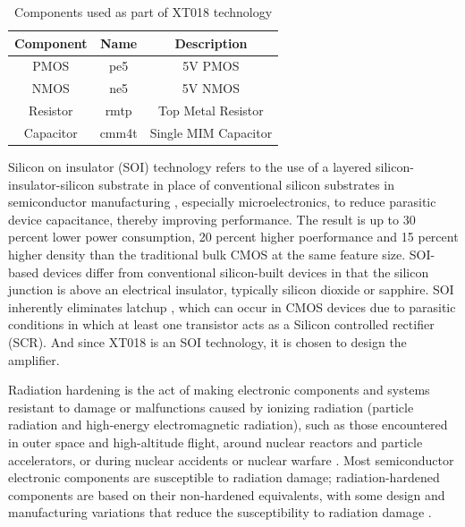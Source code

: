 \begin{table} [H]
\centering
\begin{tabular}{@{}ccc@{}}
\toprule
Component	& Name		& Description			\\ \midrule
PMOS		& pe5		& 5V PMOS				\\
NMOS		& ne5		& 5V NMOS				\\
Resistor	& rmtp		& Top Metal Resistor	\\
Capacitor	& cmm4t		& Single MIM Capacitor	\\
\bottomrule
\end{tabular}
\caption{Components used as part of XT018 technology}
\label{tab:Components}
\end{table}

Silicon on insulator (SOI) technology refers to the use of a layered silicon-insulator-silicon substrate in place of conventional silicon substrates in semiconductor manufacturing \cite{soi_tech}, especially microelectronics, to reduce parasitic device capacitance, thereby improving performance. The result is up to 30 percent lower power consumption, 20 percent higher poerformance and 15 percent higher density than the traditional bulk CMOS at the same feature size. SOI-based devices differ from conventional silicon-built devices in that the silicon junction is above an electrical insulator, typically silicon dioxide or sapphire. SOI inherently eliminates latchup \cite{soi_ease}, which can occur in CMOS devices due to parasitic conditions in which at least one transistor acts as a Silicon controlled rectifier (SCR). And since XT018 is an SOI technology, it is chosen to design the amplifier.

Radiation hardening is the act of making electronic components and systems resistant to damage or malfunctions caused by ionizing radiation (particle radiation and high-energy electromagnetic radiation), such as those encountered in outer space and high-altitude flight, around nuclear reactors and particle accelerators, or during nuclear accidents or nuclear warfare \cite{radhard}. Most semiconductor electronic components are susceptible to radiation damage; radiation-hardened components are based on their non-hardened equivalents, with some design and manufacturing variations that reduce the susceptibility to radiation damage \cite{radhard_effects}. 
